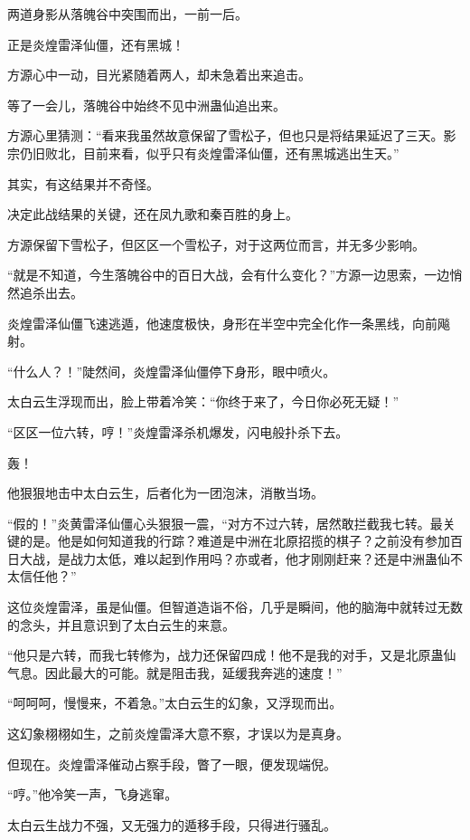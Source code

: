 
\begin{this_body}

两道身影从落魄谷中突围而出，一前一后。

正是炎煌雷泽仙僵，还有黑城！

方源心中一动，目光紧随着两人，却未急着出来追击。

等了一会儿，落魄谷中始终不见中洲蛊仙追出来。

方源心里猜测：“看来我虽然故意保留了雪松子，但也只是将结果延迟了三天。影宗仍旧败北，目前来看，似乎只有炎煌雷泽仙僵，还有黑城逃出生天。”

其实，有这结果并不奇怪。

决定此战结果的关键，还在凤九歌和秦百胜的身上。

方源保留下雪松子，但区区一个雪松子，对于这两位而言，并无多少影响。

“就是不知道，今生落魄谷中的百日大战，会有什么变化？”方源一边思索，一边悄然追杀出去。

炎煌雷泽仙僵飞速逃遁，他速度极快，身形在半空中完全化作一条黑线，向前飚射。

“什么人？！”陡然间，炎煌雷泽仙僵停下身形，眼中喷火。

太白云生浮现而出，脸上带着冷笑：“你终于来了，今日你必死无疑！”

“区区一位六转，哼！”炎煌雷泽杀机爆发，闪电般扑杀下去。

轰！

他狠狠地击中太白云生，后者化为一团泡沫，消散当场。

“假的！”炎黄雷泽仙僵心头狠狠一震，“对方不过六转，居然敢拦截我七转。最关键的是。他是如何知道我的行踪？难道是中洲在北原招揽的棋子？之前没有参加百日大战，是战力太低，难以起到作用吗？亦或者，他才刚刚赶来？还是中洲蛊仙不太信任他？”

这位炎煌雷泽，虽是仙僵。但智道造诣不俗，几乎是瞬间，他的脑海中就转过无数的念头，并且意识到了太白云生的来意。

“他只是六转，而我七转修为，战力还保留四成！他不是我的对手，又是北原蛊仙气息。因此最大的可能。就是阻击我，延缓我奔逃的速度！”

“呵呵呵，慢慢来，不着急。”太白云生的幻象，又浮现而出。

这幻象栩栩如生，之前炎煌雷泽大意不察，才误以为是真身。

但现在。炎煌雷泽催动占察手段，瞥了一眼，便发现端倪。

“哼。”他冷笑一声，飞身逃窜。

太白云生战力不强，又无强力的遁移手段，只得进行骚乱。


\end{this_body}
